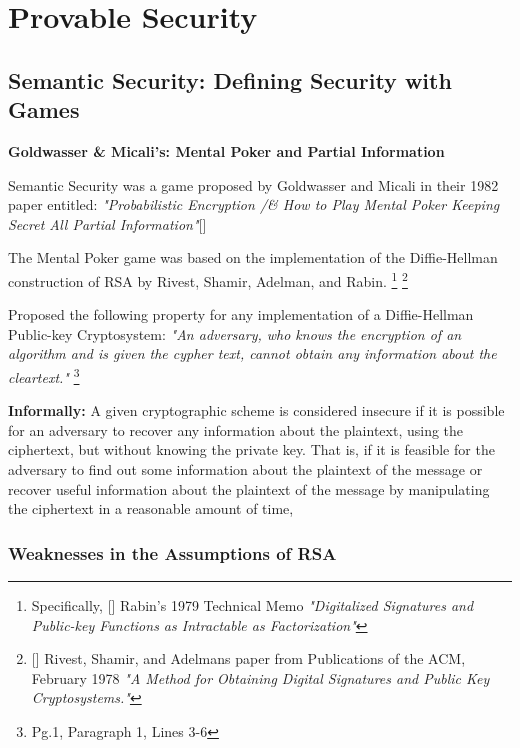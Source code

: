 \section{Provable Security} 


\subsection{Semantic Security: Defining Security with Games} 

\textbf{Goldwasser \& Micali's: Mental Poker and Partial Information} 
\bigskip

Semantic Security was a game proposed by Goldwasser and Micali in their 1982 paper entitled: \textit{"Probabilistic Encryption /& How to Play Mental Poker Keeping Secret All Partial Information"}[\cite{gol19820}]
\newline

\newline
The Mental Poker game was based on the implementation of the Diffie-Hellman construction of RSA by Rivest, Shamir, Adelman, and Rabin.
\footnote{Specifically, [\cite{rab19790}] Rabin's 1979 Technical Memo \textit{"Digitalized Signatures and Public-key Functions as Intractable as Factorization"}}
\footnote{[\cite{riv19780}] Rivest, Shamir, and Adelmans paper from Publications of the ACM, February 1978 \textit{"A Method for Obtaining Digital Signatures and Public Key Cryptosystems."}}
\medskip

\begin{defn}
 Proposed the following property for any implementation of a Diffie-Hellman Public-key Cryptosystem:  \textit{"An adversary, who knows the encryption of an algorithm and is given the cypher text, cannot obtain any information about the cleartext."} \footnote{ Pg.1, Paragraph 1, Lines 3-6} 
\end{defn}
\medskip

\textbf{Informally:}
\newline
A given cryptographic scheme is considered insecure if it is possible for an adversary to recover any information about the plaintext, using the ciphertext, but without knowing the private key. That is, if it is feasible for the adversary to find out some information about the plaintext of the message or recover useful information about the plaintext of the message by manipulating the ciphertext in a reasonable amount of time, 


\subsubsection{Weaknesses in the Assumptions of RSA} 
\medskip


